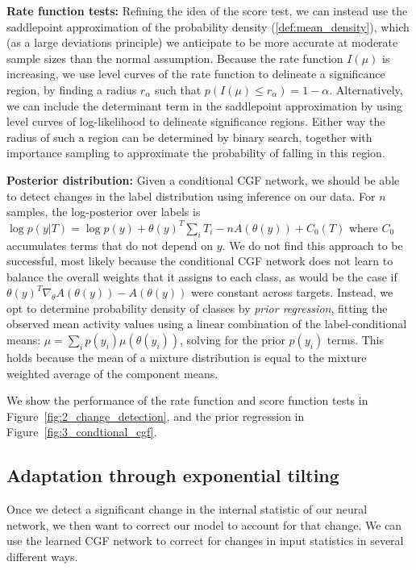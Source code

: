 \documentclass{article}      %
\begin{document}
\textbf{Rate function tests:} Refining the idea of the score test, we can instead use the saddlepoint approximation of the probability density (\ref{def:mean_density}), which (as a large deviations principle) we anticipate to be more accurate at moderate sample sizes than the normal assumption.
Because the rate function $I(\mu)$ is increasing, we use level curves of the rate function to delineate a significance region, by finding a radius $r_\alpha$ such that ${p(I(\mu) \le r_\alpha) = 1 - \alpha}$.
Alternatively, we can include the determinant term in the saddlepoint approximation by using level curves of log-likelihood to delineate significance regions.
Either way the radius of such a region can be determined by binary search, together with importance sampling to approximate the probability of falling in this region.

\textbf{Posterior distribution:} Given a conditional CGF network, we should be able to detect changes in the label distribution using inference on our data.
For $n$ samples, the log-posterior over labels is ${\log p(y|T) = \log p(y) + \theta(y)^T \sum_i T_i - n A(\theta(y)) + C_0(T)}$ where $C_0$ accumulates terms that do not depend on $y$.
We do not find this approach to be successful, most likely because the conditional CGF network does not learn to balance the overall weights that it assigns to each class, as would be the case if $\theta(y)^T \nabla_\theta A(\theta(y)) - A(\theta(y))$ were constant across targets.
Instead, we opt to determine probability density of classes by \textit{prior regression}, fitting the observed mean activity values using a linear combination of the label-conditional means: $\mu = \sum_i p(y_i) \mu(\theta(y_i))$, solving for the prior $p(y_i)$ terms.
This holds because the mean of a mixture distribution is equal to the mixture weighted average of the component means.

We show the performance of the rate function and score function tests in Figure~\ref{fig:2_change_detection}, and the prior regression in Figure~\ref{fig:3_condtional_cgf}.

\subsection{Adaptation through exponential tilting}
Once we detect a significant change in the internal statistic of our neural network, we then want to correct our model to account for that change.
We can use the learned CGF network to correct for changes in input statistics in several different ways.
\end{document}
